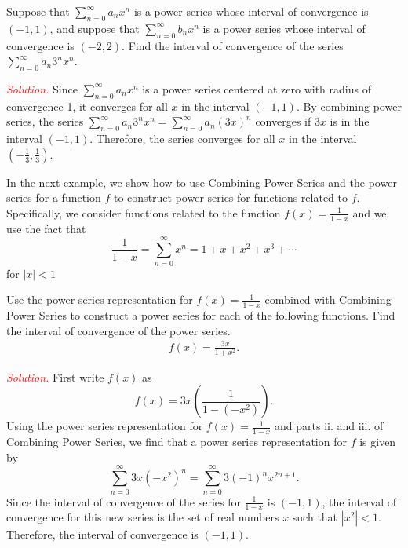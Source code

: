 \documentclass{report}
\begin{document}
    \bigbreak \noindent 
    \begin{exm}
        Suppose that \(\sum_{n=0}^{\infty} a_n x^n\) is a power series whose interval of convergence is \((-1, 1)\), and suppose that \(\sum_{n=0}^{\infty} b_n x^n\) is a power series whose interval of convergence is \((-2, 2)\).
        \bigbreak \noindent 
        Find the interval of convergence of the series \(\sum_{n=0}^{\infty} a_n 3^n x^n\).
    \end{exm}
    \bigbreak \noindent 
    \textcolor{red}{\textit{Solution.}} Since \(\sum_{n=0}^{\infty} a_n x^n\) is a power series centered at zero with radius of convergence 1, it converges for all \(x\) in the interval \((-1, 1)\). By combining power series, the series \(\sum_{n=0}^{\infty} a_n 3^n x^n = \sum_{n=0}^{\infty} a_n (3x)^n\) converges if \(3x\) is in the interval \((-1, 1)\). Therefore, the series converges for all \(x\) in the interval \(\left(-\frac{1}{3}, \frac{1}{3}\right)\).

    \pagebreak \bigbreak \noindent 
    In the next example, we show how to use Combining Power Series and the power series for a function \( f \) to construct power series for functions related to \( f \). Specifically, we consider functions related to the function \( f(x) = \frac{1}{1 - x} \) and we use the fact that
    \[
    \frac{1}{1 - x} = \sum_{n=0}^{\infty} x^n = 1 + x + x^2 + x^3 + \cdots
    \]
    for \( |x| < 1 \)

    \bigbreak \noindent 
    \begin{exm}
        Use the power series representation for \( f(x) = \frac{1}{1 - x} \) combined with Combining Power Series to construct a power series for each of the following functions. Find the interval of convergence of the power series.
        \begin{align*}
            f(x) = \frac{3x}{1+x^{2}}
        .\end{align*}
        
    \end{exm}
    \bigbreak \noindent 
    \textcolor{red}{\textit{Solution.}} First write \( f(x) \) as
    \[ f(x) = 3x \left( \frac{1}{1 - (-x^2)} \right). \]
    Using the power series representation for \( f(x) = \frac{1}{1 - x} \) and parts ii. and iii. of Combining Power Series, we find that a power series representation for \( f \) is given by
    \[ \sum_{n=0}^{\infty} 3x(-x^2)^n = \sum_{n=0}^{\infty} 3(-1)^n x^{2n+1}. \]
    Since the interval of convergence of the series for \( \frac{1}{1 - x} \) is \((-1, 1)\), the interval of convergence for this new series is the set of real numbers \( x \) such that \( |x^2| < 1 \). Therefore, the interval of convergence is \((-1, 1)\).
\end{document}
